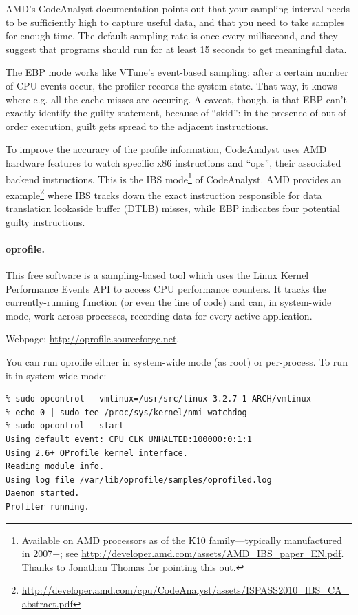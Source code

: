 \documentclass[a4paper]{report}
\begin{document}
AMD's CodeAnalyst documentation points out that your sampling interval
needs to be sufficiently high to capture useful data, and that you need to 
take samples for enough time. The default sampling rate is once every
millisecond, and they suggest that programs should run for at least 15 seconds
to get meaningful data.

The EBP mode works like VTune's event-based sampling: after a certain
number of CPU events occur, the profiler records the system state.
That way, it knows where e.g. all the cache misses are occuring.
A caveat, though, is that EBP can't exactly identify the guilty statement,
because of ``skid'': in the presence of out-of-order execution, guilt
gets spread to the adjacent instructions.

To improve the accuracy of the profile information, CodeAnalyst uses
AMD hardware features to watch specific x86 instructions and ``ops'',
their associated backend instructions. This is the IBS mode\footnote{Available
on AMD processors as of the K10 family---typically manufactured in 2007+; see \url{http://developer.amd.com/assets/AMD_IBS_paper_EN.pdf}. Thanks to Jonathan Thomas for pointing this out.} of
CodeAnalyst.  AMD provides an
example\footnote{\url{http://developer.amd.com/cpu/CodeAnalyst/assets/ISPASS2010_IBS_CA_abstract.pdf}}
where IBS tracks down the exact instruction responsible for data
translation lookaside buffer (DTLB) misses, while EBP indicates four
potential guilty instructions.


\paragraph{oprofile.} This free software is a sampling-based tool which uses the Linux Kernel Performance
Events API to access CPU performance counters. It tracks the
currently-running function (or even the line of code) and can, in
system-wide mode, work across processes, recording data for every
active application.

Webpage: \url{http://oprofile.sourceforge.net}.

You can run oprofile either in system-wide mode (as root) or per-process. To run it in system-wide mode:
  \begin{lstlisting}
% sudo opcontrol --vmlinux=/usr/src/linux-3.2.7-1-ARCH/vmlinux
% echo 0 | sudo tee /proc/sys/kernel/nmi_watchdog
% sudo opcontrol --start
Using default event: CPU_CLK_UNHALTED:100000:0:1:1
Using 2.6+ OProfile kernel interface.
Reading module info.
Using log file /var/lib/oprofile/samples/oprofiled.log
Daemon started.
Profiler running.
  \end{lstlisting}
\end{document}
